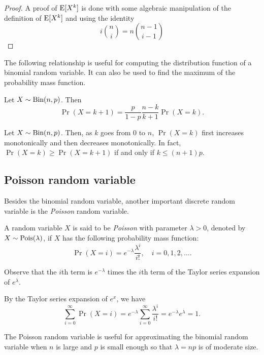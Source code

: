 \documentclass{article}
\begin{document}
\begin{proof}
  A proof of $\operatorname{E}[X^k]$ is done with some algebraic manipulation of the definition of $\operatorname{E}[X^k]$ and using the identity
  \[
    i \binom{n}{i} = n \binom{n - 1}{i - 1}
  \]
\end{proof}

The following relationship is useful for computing the distribution function of a binomial random variable.
It can also be used to find the maximum of the probability mass function.

\begin{proposition}[Relationship between $\Pr(X = k + 1)$ and $\Pr(X = k)$]
  Let $X \sim \textnormal{Bin}(n, p)$. Then
  \[
    \Pr(X = k + 1) = \frac{p}{1 - p} \frac{n - k}{k + 1} \Pr(X = k).
  \]
\end{proposition}

\begin{corollary}
  Let $X \sim \textnormal{Bin}(n, p)$.
  Then, as $k$ goes from $0$ to $n$, $\Pr(X = k)$ first increases monotonically and then decreases monotonically.
  In fact, $\Pr(X = k) \geq \Pr(X = k + 1)$ if and only if $k \leq (n + 1)p$.
\end{corollary}

\subsection{Poisson random variable}

Besides the binomial random variable, another important discrete random variable is the \emph{Poisson} random variable.

\begin{definition}
  A random variable $X$ is said to be \emph{Poisson} with parameter $\lambda > 0$, denoted by $X \sim \textnormal{Pois}(\lambda)$, if $X$ has the following probability mass function:
  \[
    \Pr(X = i) = e^{-\lambda} \frac{\lambda^i}{i!}, \quad i = 0, 1, 2, \ldots.
  \]
\end{definition}
Observe that the $i$th term is $e^{-\lambda}$ times the $i$th term of the Taylor series expansion of $e^\lambda$.

\begin{remark}
  By the Taylor series expansion of $e^x$, we have
  \[
    \sum_{i = 0}^\infty \Pr(X = i) = e^{-\lambda} \sum_{i = 0}^\infty \frac{\lambda^i}{i!} = e^{-\lambda} e^\lambda = 1.
  \]
\end{remark}

The Poisson random variable is useful for approximating the binomial random variable when $n$ is large and $p$ is small enough so that $\lambda = np$ is of moderate size.
\end{document}
